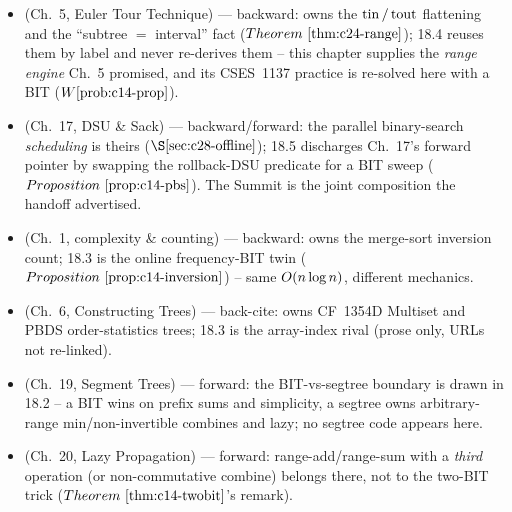 
\begin{itemize}[nosep, leftmargin=1.4em]
  \item {} (Ch.~5, Euler Tour Technique) --- backward: owns the
        \(\operatorname{tin}/\operatorname{tout}\) flattening and the ``subtree \(=\) interval'' fact
        (\(\thmref{c24-range}\)); 18.4 reuses them by label and never re-derives
        them -- this chapter supplies the \emph{range engine} Ch.~5 promised, and
        its CSES~1137 practice is re-solved here with a BIT (\(\probref{c14-prop}\)).
  \item {} (Ch.~17, DSU \& Sack) --- backward/forward: the parallel
        binary-search \emph{scheduling} is theirs (\(\secref{c28-offline}\)); 18.5
        discharges Ch.~17's forward pointer by swapping the rollback-DSU predicate
        for a BIT sweep (\(\propref{c14-pbs}\)). The Summit is the joint
        composition the handoff advertised.
  \item {} (Ch.~1, complexity \& counting) --- backward: owns the
        merge-sort inversion count; 18.3 is the online frequency-BIT twin
        (\(\propref{c14-inversion}\)) -- same \(O(n\log n)\), different mechanics.
  \item {} (Ch.~6, Constructing Trees) --- back-cite: owns CF~1354D
        Multiset and PBDS order-statistics trees; 18.3 is the array-index rival
        (prose only, URLs not re-linked).
  \item {} (Ch.~19, Segment Trees) --- forward: the BIT-vs-segtree
        boundary is drawn in 18.2 -- a BIT wins on prefix sums and simplicity, a
        segtree owns arbitrary-range min/non-invertible combines and lazy; no
        segtree code appears here.
  \item {} (Ch.~20, Lazy Propagation) --- forward: range-add/range-sum
        with a \emph{third} operation (or non-commutative combine) belongs there,
        not to the two-BIT trick (\(\thmref{c14-twobit}\)'s remark).
\end{itemize}

